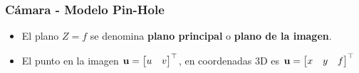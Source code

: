 \begin{frame}
    \frametitle{Cámara - Modelo Pin-Hole}
    
    
    \footnotesize
    \begin{figure}[!h]
        \centering
    \end{figure}
    
    \begin{itemize}
        \item El plano $Z = f$ se denomina {\bf plano principal} o {\bf plano de la imagen}.
        \item El punto en la imagen $\boldsymbol{\mathbf{u}}=\begin{bmatrix}u & v\end{bmatrix}^{\top}$, en coordenadas 3D es $\boldsymbol{\mathbf{u}}=\begin{bmatrix}x & y & f\end{bmatrix}^{\top}$
    \end{itemize}
\end{frame}


